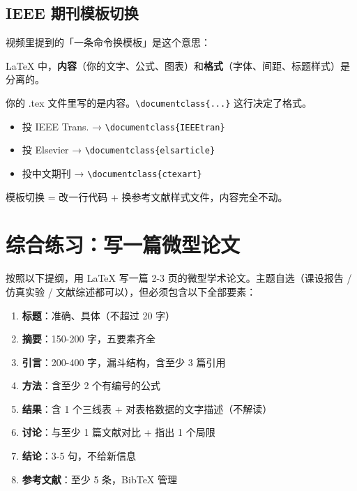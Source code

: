 \documentclass[12pt,a4paper]{ctexart}
\begin{document}
\subsection*{IEEE 期刊模板切换}

视频里提到的「一条命令换模板」是这个意思：

\begin{tcolorbox}[colback=gray!5!white, colframe=gray!50!black, title=模板切换原理]
LaTeX 中，\textbf{内容}（你的文字、公式、图表）和\textbf{格式}（字体、间距、标题样式）是分离的。

你的 .tex 文件里写的是内容。\texttt{\textbackslash documentclass\{...\}} 这行决定了格式。

\begin{itemize}
    \item 投 IEEE Trans. → \texttt{\textbackslash documentclass\{IEEEtran\}}
    \item 投 Elsevier → \texttt{\textbackslash documentclass\{elsarticle\}}
    \item 投中文期刊 → \texttt{\textbackslash documentclass\{ctexart\}}
\end{itemize}

模板切换 = 改一行代码 + 换参考文献样式文件，内容完全不动。
\end{tcolorbox}


\section{综合练习：写一篇微型论文}

按照以下提纲，用 LaTeX 写一篇 2-3 页的微型学术论文。主题自选（课设报告 / 仿真实验 / 文献综述都可以），但必须包含以下全部要素：

\begin{enumerate}[label=\textbf{\arabic*.},leftmargin=*]
    \item \textbf{标题}：准确、具体（不超过 20 字）
    \item \textbf{摘要}：150-200 字，五要素齐全
    \item \textbf{引言}：200-400 字，漏斗结构，含至少 3 篇引用
    \item \textbf{方法}：含至少 2 个有编号的公式
    \item \textbf{结果}：含 1 个三线表 + 对表格数据的文字描述（不解读）
    \item \textbf{讨论}：与至少 1 篇文献对比 + 指出 1 个局限
    \item \textbf{结论}：3-5 句，不给新信息
    \item \textbf{参考文献}：至少 5 条，BibTeX 管理
\end{enumerate}
\end{document}
